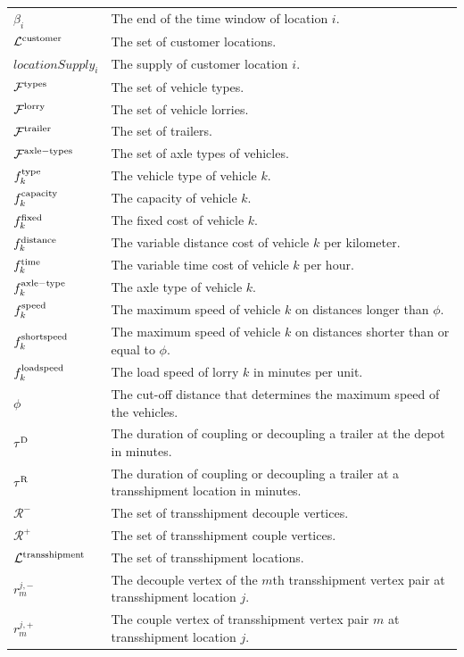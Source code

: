 \begin{longtable}{ll}
$\beta_i$ & The end of the time window of location $i$. \\
$\mathcal L^{\rm customer}$ & The set of customer locations. \\
$locationSupply_i$ & The supply of customer location $i$. \\
$\mathcal F^{\rm types}$ & The set of vehicle types. \\
$\mathcal F^{\rm lorry}$ & The set of vehicle lorries. \\
$\mathcal F^{\rm trailer}$ & The set of trailers. \\
$\mathcal F^{\rm axle-types}$ & The set of axle types of vehicles.\\
$f^{\rm type}_k$ & The vehicle type of  vehicle $k$. \\
$f^{\rm capacity}_k$ & The capacity of vehicle $k$. \\
$f^{\rm fixed}_k$ & The fixed cost of vehicle $k$. \\
$f^{\rm distance}_k$ & The variable distance cost of vehicle $k$ per kilometer. \\
$f^{\rm time}_k$ & The variable time cost of vehicle $k$ per hour. \\
$f^{\rm axle-type}_k$ & The axle type of vehicle $k$. \\
$f^{\rm speed}_k$ & The maximum speed of vehicle $k$ on distances longer than $\phi$. \\
$f^{\rm shortspeed}_k$ & The maximum speed of vehicle $k$ on distances shorter than or equal to $\phi$. \\
$f^{\rm loadspeed}_k$ & The load speed of lorry $k$ in minutes per unit. \\
$\phi$ & The cut-off distance that determines the maximum speed of the vehicles. \\
$\tau^{\rm D}$ & The duration of coupling or decoupling a trailer at the depot in minutes. \\
$\tau^{\rm R}$ & The duration of coupling or decoupling a trailer at a transshipment location in minutes. \\
$\mathcal R^-$ & The set of transshipment decouple vertices. \\
$\mathcal R^+$ & The set of transshipment couple vertices. \\
$\mathcal L^{\rm transshipment}$ & The set of transshipment locations. \\
$r^{j,-}_m$ & The decouple vertex of the $m$th transshipment vertex pair  at transshipment location $j$. \\
$r^{j,+}_m$ & The couple vertex of transshipment vertex pair $m$ at transshipment location $j$. \\

\end{longtable}

